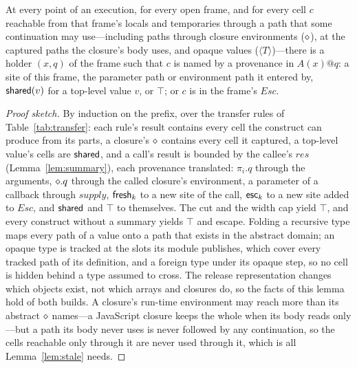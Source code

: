 \begin{lemma}
\label{lem:flow}
At every point of an execution, for every open frame, and for every cell $c$ reachable from that
frame's locals and temporaries through a path that some continuation may use---including paths through
closure environments ($\diamond$), at the captured paths the closure's body uses, and opaque values
($\langle T\rangle$)---there is a holder $(x, q)$ of the frame such that $c$ is named
by a provenance in $A(x)@q$: a site of this frame, the parameter path or environment path it entered by,
$\mathsf{shared}(v)$ for a top-level value $v$, or $\top$; or $c$ is in the frame's $\mathit{Esc}$.
\end{lemma}
\begin{proof}[Proof sketch]
By induction on the prefix, over the transfer rules of Table~\ref{tab:transfer}: each rule's result
contains every cell the construct can produce from its parts, a closure's $\diamond$ contains every cell
it captured, a top-level value's cells are $\mathsf{shared}$, and a call's result is bounded by the callee's
$\mathit{res}$ (Lemma~\ref{lem:summary}), each provenance translated: $\pi_i.q$ through the arguments,
$\diamond.q$ through the called closure's environment, a parameter of a callback through $\mathit{supply}$,
$\mathsf{fresh}_k$ to a new site of the call, $\mathsf{esc}_k$ to a new site added to $\mathit{Esc}$, and $\mathsf{shared}$ and
$\top$ to themselves. The cut and the width cap yield $\top$, and every construct without a summary
yields $\top$ and escape. Folding a recursive type maps every path of a value onto a path that exists in
the abstract domain; an opaque type is tracked at the slots its module publishes, which cover every
tracked path of its definition, and a foreign type under its opaque step, so no cell is hidden behind a
type assumed to cross. The release representation changes which objects exist, not which arrays and
closures do, so the facts of this lemma hold of both builds. A closure's run-time environment may
reach more than its abstract $\diamond$ names---a JavaScript closure keeps the whole  when its
body reads only ---but a path its body never uses is never followed by any
continuation, so the cells reachable only through it are never used through it, which is all
Lemma~\ref{lem:stale} needs.
\end{proof}

